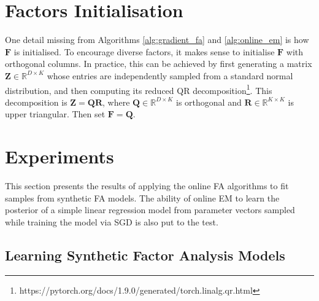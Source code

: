 \documentclass[msc,deptreport.inf]{infthesis} %
\newcommand{\matr}[1]{\mathbf{#1}}
\newcommand{\R}{\mathbb R}
\begin{document}
\section{Factors Initialisation}\label{sec:F_init}

One detail missing from Algorithms \ref{alg:gradient_fa} and \ref{alg:online_em} is how $\matr{F}$ is initialised. To encourage diverse factors, it makes sense to initialise $\matr{F}$ with orthogonal columns. In practice, this can be achieved by first generating a matrix $\matr{Z}  \in \R^{D \times K}$ whose entries are independently sampled from a standard normal distribution, and then computing its reduced QR decomposition\footnote{https://pytorch.org/docs/1.9.0/generated/torch.linalg.qr.html}. This decomposition is $\matr{Z} = \matr{Q}\matr{R}$, where $\matr{Q} \in \R^{D \times K}$ is orthogonal and $\matr{R} \in \R^{K \times K}$ is upper triangular. Then set $\matr{F} = \matr{Q}$.


\section{Experiments}

This section presents the results of applying the online FA algorithms to fit samples from synthetic FA models. The ability of online EM to learn the posterior of a simple linear regression model from parameter vectors sampled while training the model via SGD is also put to the test.

\subsection{Learning Synthetic Factor Analysis Models}\label{ch:online_fa_experiments}
\end{document}
